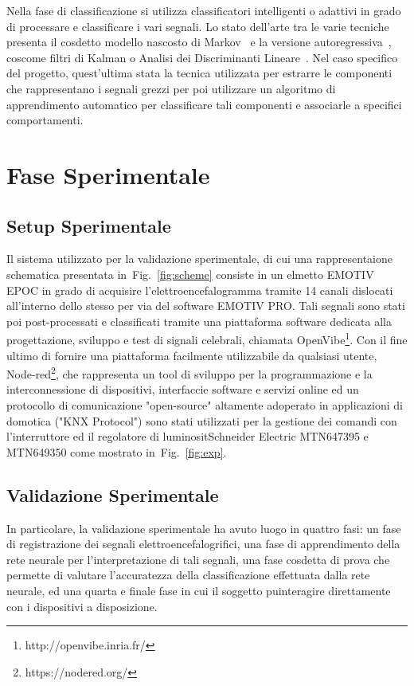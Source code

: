 \documentclass[a4paper]{article}
\newcommand{\fig}{Fig.~}	%
\begin{document}
Nella fase di classificazione si utilizza classificatori intelligenti o adattivi in grado di processare e classificare i vari segnali. Lo stato dell'arte tra le varie tecniche presenta il cos\iacuto detto modello nascosto di Markov~\cite{2018-Li} e la versione autoregressiva~\cite{2010-Arg}, cos\iacuto come filtri di Kalman o Analisi dei Discriminanti Lineare~\cite{2014-Dua}. Nel caso specifico del progetto, quest'ultima \egrave stata la tecnica utilizzata per estrarre le componenti che rappresentano i segnali grezzi per poi utilizzare un algoritmo di apprendimento automatico per classificare tali componenti e associarle a specifici comportamenti.

\section{Fase Sperimentale}

\subsection{Setup Sperimentale}
Il sistema utilizzato per la validazione sperimentale, di cui una rappresentaione schematica \egrave presentata in~\fig\ref{fig:scheme} consiste in un elmetto EMOTIV EPOC in grado di acquisire l'elettroencefalogramma tramite 14 canali dislocati all'interno dello stesso per via del software EMOTIV PRO. Tali segnali sono stati poi post-processati e classificati tramite una piattaforma software dedicata alla progettazione, sviluppo e test di signali celebrali, chiamata OpenVibe\footnote{http://openvibe.inria.fr/}. Con il fine ultimo di fornire una piattaforma facilmente utilizzabile da qualsiasi utente, Node-red\footnote{https://nodered.org/}, che rappresenta un tool di sviluppo per la programmazione e la interconnessione di dispositivi, interfaccie software e servizi online ed un protocollo di comunicazione "open-source" altamente adoperato in applicazioni di domotica ("KNX Protocol") sono stati utilizzati per la gestione dei comandi con l'interruttore ed il regolatore di luminosit\aacuto Schneider Electric MTN647395 e MTN649350 come mostrato in~\fig\ref{fig:exp}.

\subsection{Validazione Sperimentale}

In particolare, la validazione sperimentale ha avuto luogo in quattro fasi: un fase di registrazione dei segnali elettroencefalogrifici, una fase di apprendimento della rete neurale per l'interpretazione di tali segnali, una fase cos\iacuto detta di prova che permette di valutare l'accuratezza della classificazione effettuata dalla rete neurale, ed una quarta e finale fase in cui il soggetto pu\oacuto interagire direttamente con i dispositivi a disposizione.
 
\end{document}
